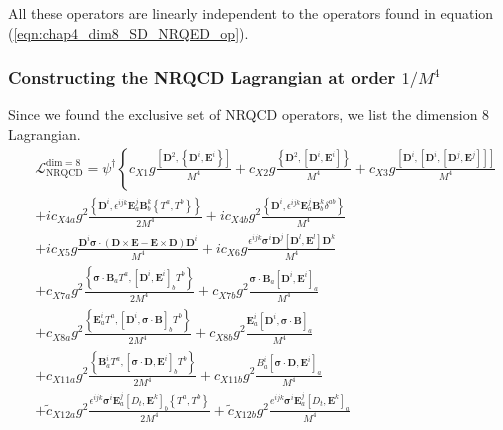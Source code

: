 All these operators are linearly independent to the operators found in equation (\ref{eqn:chap4_dim8_SD_NRQED_op}). 
\vspace{-0.3cm}
\subsubsection{Constructing the NRQCD Lagrangian at order $1/M^4$}
\vspace{-0.3cm}
Since we found the exclusive set of NRQCD operators, we list the dimension 8 Lagrangian.
\begin{align}\label{eqn:Dim_8_Lagrangian}
&{\mathcal{L}_{\mathrm{NRQCD}}^{\mathrm{dim}=8}=\psi^{\dagger}\left\{c_{X 1} g \frac{\left[\bm{D}^{2},\left\{\bm{D}^{i}, \bm{E}^{i}\right\}\right]}{M^{4}}+c_{X 2} g \frac{\left\{\bm{D}^{2},\left[\bm{D}^{i}, \bm{E}^{i}\right]\right\}}{M^{4}}+c_{X 3} g \frac{\left[\bm{D}^{i},\left[\bm{D}^{i},\left[\bm{D}^{j}, \bm{E}^{j}\right]\right]\right]}{M^{4}}\right.}\nonumber \\
&+i c_{X 4 a} g^{2} \frac{\left\{\bm{D}^{i}, \epsilon^{i j k} \bm{E}_{a}^{j} \bm{B}_{b}^{k}\left\{T^{a}, T^{b}\right\}\right\}}{2 M^{4}}+i c_{X 4 b} g^{2} \frac{\left\{\bm{D}^{i}, \epsilon^{i j k} \bm{E}_{a}^{j} \bm{B}_{b}^{k} \delta^{a b}\right\}}{M^{4}}\nonumber\\
&+i c_{X 5} g \frac{\bm{D}^{i} \bm{\sigma} \cdot(\bm{D} \times \bm{E}-\bm{E} \times \bm{D}) \bm{D}^{i}}{M^{4}}+i c_{X 6} g \frac{\epsilon^{i j k} \bm{\sigma}^{i} \bm{D}^{j}\left[\bm{D}^{l}, \bm{E}^{l}\right] \bm{D}^{k}}{M^{4}}\nonumber\\
&+c_{X 7 a} g^{2} \frac{\left\{\bm{\sigma} \cdot \bm{B}_{a} T^{a},\left[\bm{D}^{i}, \bm{E}^{i}\right]_{b} T^{b}\right\}}{2 M^{4}}+c_{X 7 b} g^{2} \frac{\bm{\sigma} \cdot \bm{B}_{a}\left[\bm{D}^{i}, \bm{E}^{i}\right]_{a}}{M^{4}}\nonumber\\
&+c_{X 8 a} g^{2} \frac{\left\{\bm{E}_{a}^{i} T^{a},\left[\bm{D}^{i}, \bm{\sigma} \cdot \bm{B}\right]_{b} T^{b}\right\}}{2 M^{4}}+c_{X 8 b} g^{2} \frac{\bm{E}_{a}^{i}\left[\bm{D}^{i}, \bm{\sigma} \cdot \bm{B}\right]_{a}}{M^{4}}\nonumber\\
&+c_{X 11 a} g^{2} \frac{\left\{\bm{B}_{a}^{i} T^{a},\left[\bm{\sigma} \cdot \bm{D}, \bm{E}^{i}\right]_{b} T^{b}\right\}}{2 M^{4}}+c_{X 11 b} g^{2} \frac{B_{a}^{i}\left[\bm{\sigma} \cdot \bm{D}, \bm{E}^{i}\right]_{a}}{M^{4}}\nonumber\\
&+\tilde{c}_{X 12 a} g^{2} \frac{\epsilon^{i j k} \bm{\sigma}^{i} \bm{E}_{a}^{j}\left[D_{t}, \bm{E}^{k}\right]_{b}\left\{T^{a}, T^{b}\right\}}{2 M^{4}}+\tilde{c}_{X 12 b} g^{2} \frac{e^{i j k} \bm{\sigma}^{i} \bm{E}_{a}^{j}\left[D_{t}, \bm{E}^{k}\right]_{a}}{M^{4}}\nonumber\\

\end{align}
